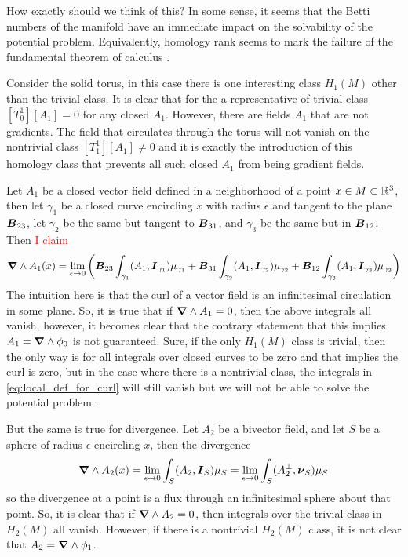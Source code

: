 \documentclass{article}
\begin{document}
How exactly should we think of this? In some sense, it seems that the Betti numbers of the manifold have an immediate impact on the solvability of the potential problem. Equivalently, homology rank seems to mark the failure of the fundamental theorem of calculus . 

Consider the solid torus, in this case there is one interesting class $H_1(M)$ other than the trivial class. It is clear that for the a representative of trivial class $[T_0^1][A_1]=0$ for any closed $A_1$. However, there are fields $A_1$ that are not gradients. The field that circulates through the torus will not vanish on the nontrivial class $[T_1^1][A_1]\neq 0$ and it is exactly the introduction of this homology class that prevents all such closed $A_1$ from being gradient fields. 

Let $A_1$ be a closed vector field defined in a neighborhood of a point $x\in M \subset \mathbb{R}^3$, then let $\gamma_1$ be a closed curve encircling $x$ with radius $\epsilon$ and tangent to the plane $\boldsymbol{B}_{23}$, let $\gamma_2$ be the same but tangent to $\boldsymbol{B}_{31}$, and $\gamma_3$ be the same but in $\boldsymbol{B}_{12}$. Then \textcolor{red}{I claim}
\begin{equation}
\label{eq:local_def_for_curl}
    \boldsymbol{\nabla} \wedge A_1(x) = \lim_{\epsilon \to 0}  \left( \boldsymbol{B}_{23} \int_{\gamma_1} (A_1,\boldsymbol{I}_{\gamma_1})\mu_{\gamma_1} + \boldsymbol{B}_{31} \int_{\gamma_2} (A_1,\boldsymbol{I}_{\gamma_2})\mu_{\gamma_2} + \boldsymbol{B}_{12} \int_{\gamma_3} (A_1,\boldsymbol{I}_{\gamma_3})\mu_{\gamma_3} \right) 
\end{equation}
The intuition here is that the curl of a vector field is an infinitesimal circulation in some plane. So, it is true that if $\boldsymbol{\nabla} \wedge A_1=0$, then the above integrals all vanish, however, it becomes clear that the contrary statement that this implies $A_1 = \boldsymbol{\nabla} \wedge \phi_0$ is not guaranteed. Sure, if the only $H_1(M)$ class is trivial, then the only way is for all integrals over closed curves to be zero and that implies the curl is zero, but in the case where there is a nontrivial class, the integrals in \cref{eq:local_def_for_curl} will still vanish but we will not be able to solve the potential problem .

But the same is true for divergence. Let $A_2$ be a bivector field, and let $S$ be a sphere of radius $\epsilon$ encircling $x$, then the divergence
\begin{equation}
    \label{eq:local_def_for_div}
    \boldsymbol{\nabla} \wedge A_2(x) = \lim_{\epsilon \to 0} \int_S (A_2, \boldsymbol{I}_S) \mu_S = \lim_{\epsilon \to 0} \int_S (A_2^\perp,\boldsymbol{\nu}_S)\mu_S
\end{equation}
so the divergence at a point is a flux through an infinitesimal sphere about that point. So, it is clear that if $\boldsymbol{\nabla} \wedge A_2=0$, then integrals over the trivial class in $H_2(M)$ all vanish. However, if there is a nontrivial $H_2(M)$ class, it is not clear that $A_2 = \boldsymbol{\nabla} \wedge \phi_1$.
\end{document}
